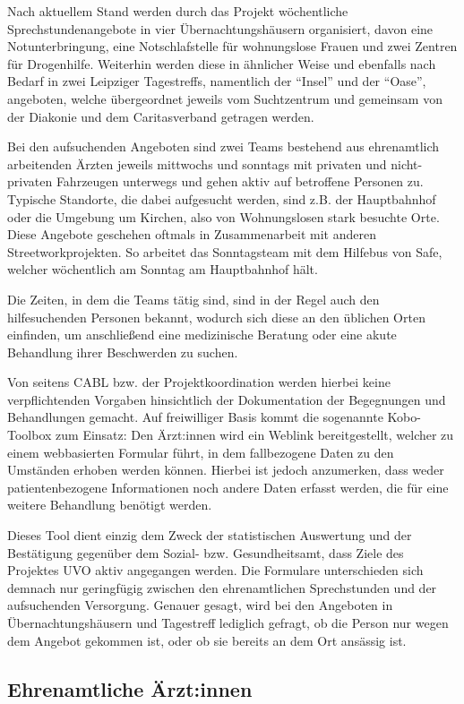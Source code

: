 Nach aktuellem Stand werden durch das Projekt wöchentliche Sprechstundenangebote in vier Übernachtungshäusern organisiert, davon eine Notunterbringung, eine Notschlafstelle für wohnungslose Frauen und zwei Zentren für Drogenhilfe. Weiterhin werden diese in ähnlicher Weise und ebenfalls nach Bedarf in zwei Leipziger Tagestreffs, namentlich der \enquote{Insel} und der \enquote{Oase}, angeboten, welche übergeordnet jeweils vom Suchtzentrum und gemeinsam von der Diakonie und dem Caritasverband getragen werden.

Bei den aufsuchenden Angeboten sind zwei Teams bestehend aus ehrenamtlich arbeitenden Ärzten jeweils mittwochs und sonntags mit privaten und nicht-privaten Fahrzeugen unterwegs und gehen aktiv auf betroffene Personen zu. Typische Standorte, die dabei aufgesucht werden, sind z.B. der Hauptbahnhof oder die Umgebung um Kirchen, also von Wohnungslosen stark besuchte Orte. Diese Angebote geschehen oftmals in Zusammenarbeit mit anderen Streetworkprojekten. So arbeitet das Sonntagsteam mit dem Hilfebus von \ac{Safe}, welcher wöchentlich am Sonntag am Hauptbahnhof hält.

Die Zeiten, in dem die Teams tätig sind, sind in der Regel auch den hilfesuchenden Personen bekannt, wodurch sich diese an den üblichen Orten einfinden, um anschließend eine medizinische Beratung oder eine akute Behandlung ihrer Beschwerden zu suchen.

Von seitens CABL bzw. der Projektkoordination werden hierbei keine verpflichtenden Vorgaben hinsichtlich der Dokumentation der Begegnungen und Behandlungen gemacht. Auf freiwilliger Basis kommt die sogenannte Kobo-Toolbox zum Einsatz: Den Ärzt:innen wird ein Weblink bereitgestellt, welcher zu einem webbasierten Formular führt, in dem fallbezogene Daten zu den Umständen erhoben werden können. Hierbei ist jedoch anzumerken, dass weder patientenbezogene Informationen noch andere Daten erfasst werden, die für eine weitere Behandlung benötigt werden.

Dieses Tool dient einzig dem Zweck der statistischen Auswertung und der Bestätigung gegenüber dem Sozial- bzw. Gesundheitsamt, dass Ziele des Projektes UVO aktiv angegangen werden. Die Formulare unterschieden sich demnach nur geringfügig zwischen den ehrenamtlichen Sprechstunden und der aufsuchenden Versorgung. Genauer gesagt, wird bei den Angeboten in Übernachtungshäusern und Tagestreff lediglich gefragt, ob die Person nur wegen dem Angebot gekommen ist, oder ob sie bereits an dem Ort ansässig ist.

\subsection{Ehrenamtliche Ärzt:innen}

